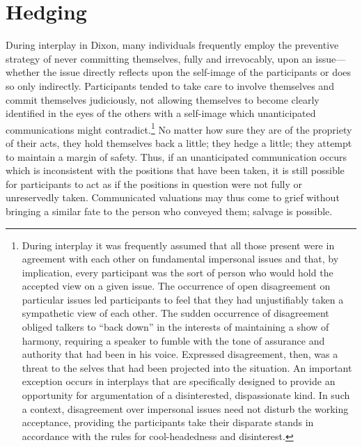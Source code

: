 \documentclass[twoside,symmetric,nobib,justified]{tufte-book}
\begin{document}
\hypertarget{hedging}{%
\section{Hedging}\label{hedging}}

During interplay in Dixon, many individuals frequently employ the
preventive strategy of never committing themselves, fully and
irrevocably, upon an issue---whether the issue directly reflects upon
the self-image of the participants or does so only indirectly.
Participants tended to take care to involve themselves and commit
themselves judiciously, not allowing themselves to become clearly
identified in the eyes of the others with a self-image which
unanticipated communications might contradict.\footnote{During interplay
  it was frequently assumed that all those present were in agreement
  with each other on fundamental impersonal issues and that, by
  implication, every participant was the sort of person who would hold
  the accepted view on a given issue. The occurrence of open
  disagreement on particular issues led participants to feel that they
  had unjustifiably taken a sympathetic view of each other. The sudden
  occurrence of disagreement obliged talkers to ``back down'' in the
  interests of maintaining a show of harmony, requiring a speaker to
  fumble with the tone of assurance and authority that had been in his
  voice. Expressed disagreement, then, was a threat to the selves that
  had been projected into the situation. An important exception occurs
  in interplays that are specifically designed to provide an opportunity
  for argumentation of a disinterested, dispassionate kind. In such a
  context, disagreement over impersonal issues need not disturb the
  working acceptance, providing the participants take their disparate
  stands in accordance with the rules for cool-headedness and
  disinterest.} No matter how sure they are of the propriety of their
acts, they hold themselves back a little; they hedge a little; they
attempt to maintain a margin of safety. Thus, if an unanticipated
communication occurs which is inconsistent with the positions that have
been taken, it is still possible for participants to act as if the
positions in question were not fully or unreservedly taken. Communicated
valuations may thus come to grief without bringing a similar fate to the
person who conveyed them; salvage is possible.
\end{document}
